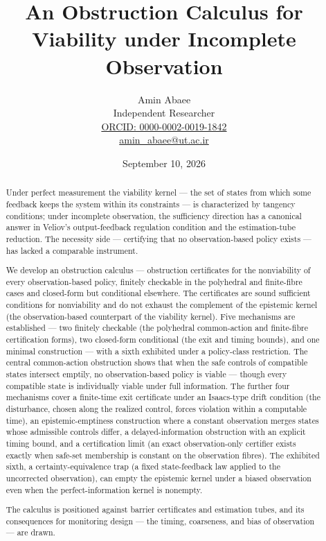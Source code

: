 \documentclass[11pt]{article}
\begin{document}
\title{An Obstruction Calculus for Viability under Incomplete Observation}
\author{Amin Abaee\\[0.35em]
{\small Independent Researcher}\\[0.55em]
{\small\href{https://orcid.org/0000-0002-0019-1842}{ORCID: 0000-0002-0019-1842}}\\[0.3em]
{\small\href{mailto:amin\_abaee@ut.ac.ir}{amin\_abaee@ut.ac.ir}}}
\date{September 10, 2026}
\maketitle

\begin{abstract}


Under perfect measurement the viability kernel --- the set of states
from which some feedback keeps the system within its constraints --- is
characterized by tangency conditions; under incomplete observation, the
sufficiency direction has a canonical answer in Veliov's output-feedback
regulation condition and the estimation-tube reduction. The necessity
side --- certifying that no observation-based policy exists --- has
lacked a comparable instrument.

We develop an obstruction calculus --- obstruction certificates for the
nonviability of every observation-based policy, finitely checkable in
the polyhedral and finite-fibre cases and closed-form but conditional
elsewhere. The certificates are sound sufficient conditions for
nonviability and do not exhaust the complement of the epistemic kernel
(the observation-based counterpart of the viability kernel). Five
mechanisms are established --- two finitely checkable (the polyhedral
common-action and finite-fibre certification forms), two closed-form
conditional (the exit and timing bounds), and one minimal construction
--- with a sixth exhibited under a policy-class restriction. The central
common-action obstruction shows that when the safe controls of
compatible states intersect emptily, no observation-based policy is
viable --- though every compatible state is individually viable under
full information. The further four mechanisms cover a finite-time exit
certificate under an Isaacs-type drift condition (the disturbance,
chosen along the realized control, forces violation within a computable
time), an epistemic-emptiness construction where a constant observation
merges states whose admissible controls differ, a delayed-information
obstruction with an explicit timing bound, and a certification limit (an
exact observation-only certifier exists exactly when safe-set membership
is constant on the observation fibres). The exhibited sixth, a
certainty-equivalence trap (a fixed state-feedback law applied to the
uncorrected observation), can empty the epistemic kernel under a biased
observation even when the perfect-information kernel is nonempty.

The calculus is positioned against barrier certificates and estimation
tubes, and its consequences for monitoring design --- the timing,
coarseness, and bias of observation --- are drawn.

\end{abstract}
\end{document}
